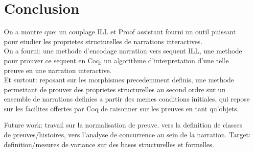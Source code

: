 \documentclass[runningheads,a4paper]{llncs}
\begin{document}
\section{Conclusion}
On a montre que: un couplage ILL et Proof assistant fourni un outil puissant pour etudier les proprietes structurelles de narrations interactives.\\
On a fourni: une methode d'encodage narration vers sequent ILL, une methode pour prouver ce sequent en Coq, un algorithme d'interpretation d'une telle preuve en une narration interactive.\\
Et surtout: reposant sur les morphismes precedemment definis, une methode permettant de prouver des proprietes structurelles au second ordre sur un ensemble de narrations definies a partir des memes conditions initiales, qui repose sur les facilites offertes par Coq de raisonner sur les preuves en tant qu'objets.

Future work: travail sur la normalisation de preuve. vers la definition de classes de preuves/histoires, vers l'analyse de concurrence au sein de la narration. Target: definition/mesures de variance sur des bases structurelles et formelles.
%


\end{document}
